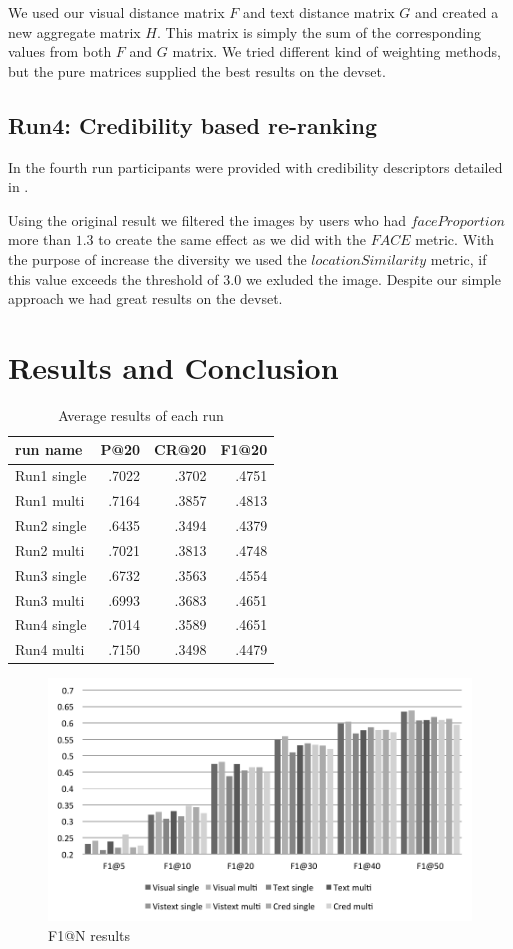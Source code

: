 \documentclass{acm_proc_article-me}
\begin{document}
We used our visual distance matrix $F$ and text distance matrix $G$ and created a new aggregate matrix $H$. This matrix is simply the sum of the corresponding values from both $F$ and $G$ matrix. We tried different kind of weighting methods, but the pure matrices supplied the best results on the devset.

\subsection{Run4: Credibility based re-ranking}
In the fourth run participants were provided with credibility descriptors detailed in \cite{Task2015}.

Using the original result we filtered the images by users who had $faceProportion$ more than $1.3$ to create the same effect as we did with the $FACE$ metric. With the purpose of increase the diversity we used the $locationSimilarity$ metric, if this value exceeds the threshold of $3.0$ we exluded the image. Despite our simple approach we had great results on the devset.

\section{Results and Conclusion}

\begin{table}[h]
	\centering
\begin{tabular}{|l|r|r|r|}
	\hline 
	run name & P@20 & CR@20 & F1@20\tabularnewline
	\hline 
	\hline 
	Run1 single & .7022 & .3702 & .4751\tabularnewline
	\hline 
	Run1 multi & .7164 & .3857 & .4813\tabularnewline
	\hline 
	Run2 single & .6435 & .3494 & .4379\tabularnewline
	\hline 
	Run2 multi & .7021 & .3813 & .4748\tabularnewline
	\hline 
	Run3 single & .6732 & .3563 & .4554\tabularnewline
	\hline 
	Run3 multi & .6993 & .3683 & .4651\tabularnewline
	\hline 
	Run4 single & .7014 & .3589 & .4651\tabularnewline
	\hline 
	Run4 multi & .7150 & .3498 & .4479\tabularnewline
	\hline
\end{tabular}
\label{table:results}
\caption{Average results of each run}
\end{table}

\begin{figure}[h]
\includegraphics[width=1.0\linewidth]{f1}
\caption{F1@N results}
\label{fig:f1}
\end{figure}
\end{document}

